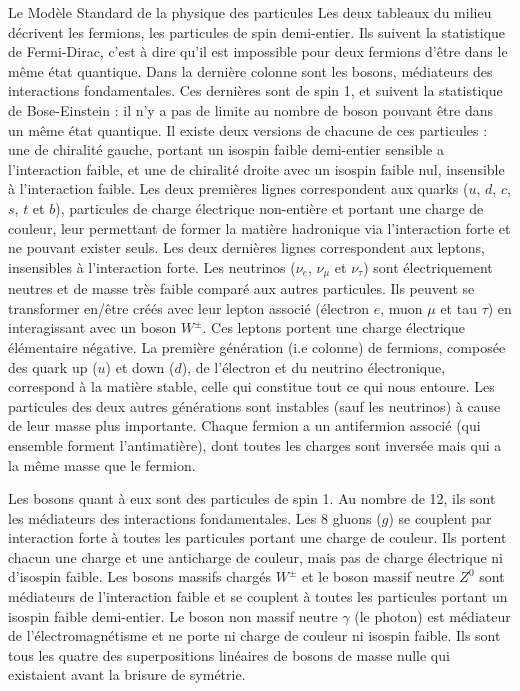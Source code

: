 \begin{figure*}[!htb!]
\begin{activitybox}[label=box::SM]{Le Modèle Standard de la physique des particules}
          Les deux tableaux du milieu décrivent les fermions, les particules de spin demi-entier. Ils suivent la statistique de Fermi-Dirac, c'est à dire qu'il est impossible pour deux fermions d'être dans le même état quantique. Dans la dernière colonne sont les bosons, médiateurs des interactions fondamentales. Ces dernières sont de spin 1, et suivent la statistique de Bose-Einstein : il n'y a pas de limite au nombre de boson pouvant être dans un même état quantique. Il existe deux versions de chacune de ces particules : une de chiralité gauche, portant un isospin faible demi-entier sensible a l'interaction faible, et une de chiralité droite avec un isospin faible nul, insensible à l'interaction faible. Les deux premières lignes correspondent aux quarks ($u$, $d$, $c$, $s$, $t$ et $b$), particules de charge électrique non-entière et portant une charge de couleur, leur permettant de former la matière hadronique via l'interaction forte et ne pouvant exister seuls. Les deux dernières lignes correspondent aux leptons, insensibles à l'interaction forte. Les neutrinos  ($\nu_e$, $\nu_{\mu}$ et $\nu_{\tau}$) sont électriquement neutres et de masse très faible comparé aux autres particules. Ils peuvent se transformer en/être créés avec leur lepton associé (électron $e$, muon $\mu$ et tau $\tau$) en interagissant avec un boson $W^{\pm}$. Ces leptons portent une charge électrique élémentaire négative. La première génération (i.e colonne) de fermions, composée des quark up ($u$) et down ($d$), de l'électron et du neutrino électronique, correspond à la matière stable, celle qui constitue tout ce qui nous entoure. Les particules des deux autres générations sont instables (sauf les neutrinos) à cause de leur masse plus importante. Chaque fermion a un antifermion associé (qui ensemble forment l'antimatière), dont toutes les charges sont inversée mais qui a la même masse que le fermion.
        
          Les bosons quant à eux sont des particules de spin 1. Au nombre de 12, ils sont les médiateurs des interactions fondamentales. Les 8 gluons ($g$) se couplent par interaction forte à toutes les particules portant une charge de couleur. Ils portent chacun une charge et une anticharge de couleur, mais pas de charge électrique ni d'isospin faible. Les bosons massifs chargés $W^{\pm}$ et le boson massif neutre $Z^0$ sont médiateurs de l'interaction faible et se couplent à toutes les particules portant un isospin faible demi-entier. Le boson non massif neutre $\gamma$ (le photon) est médiateur de l'électromagnétisme et ne porte ni charge de couleur ni isospin faible. Ils sont tous les quatre des superpositions linéaires de bosons de masse nulle qui existaient avant la brisure de symétrie.
        \end{activitybox}
      \end{figure*}

